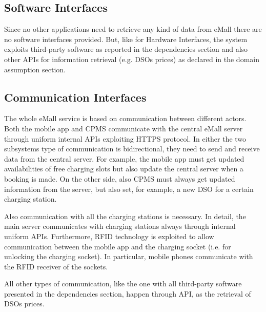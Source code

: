 \documentclass[a4paper]{report}
\begin{document}
\subsection{Software Interfaces}
Since no other applications need to retrieve any kind of data from eMall there are no software interfaces provided. But, like for Hardware Interfaces, the system exploits third-party software as reported in the dependencies section and also other APIs for information retrieval (e.g. DSOs prices) as declared in the domain assumption section.
\subsection{Communication Interfaces}
The whole eMall service is based on communication between different actors. Both the mobile app and CPMS communicate with the central eMall server through uniform internal APIs exploiting HTTPS protocol. In either the two subsystems type of communication is bidirectional, they need to send and receive data from the central server. For example, the mobile app must get updated availabilities of free charging slots but also update the central server when a booking is made. On the other side, also CPMS must always get updated information from the server, but also set, for example, a new DSO for a certain charging station.

Also communication with all the charging stations is necessary. In detail, the main server communicates with charging stations always through internal uniform APIs. Furthermore, RFID technology is exploited to allow communication between the mobile app and the charging socket (i.e. for unlocking the charging socket). In particular, mobile phones communicate with the RFID receiver of the sockets.

All other types of communication, like the one with all third-party software presented in the dependencies section, happen through API, as the retrieval of DSOs prices.
\end{document}
